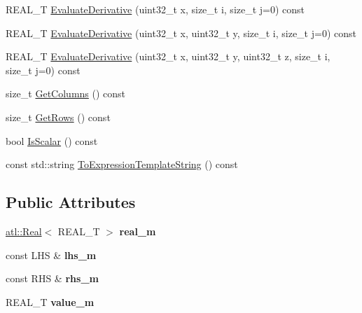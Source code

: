 \begin{DoxyCompactItemize}
\item 
R\+E\+A\+L\+\_\+\+T \hyperlink{structatl_1_1_pow_a9f3c0b19723d735fa733764006c84914}{Evaluate\+Derivative} (uint32\+\_\+t x, size\+\_\+t i, size\+\_\+t j=0) const 
\item 
R\+E\+A\+L\+\_\+\+T \hyperlink{structatl_1_1_pow_ac192ad0cdb7592038e0d4af6e735fe88}{Evaluate\+Derivative} (uint32\+\_\+t x, uint32\+\_\+t y, size\+\_\+t i, size\+\_\+t j=0) const 
\item 
R\+E\+A\+L\+\_\+\+T \hyperlink{structatl_1_1_pow_a337409b2b5e07d18b20458c59fa069f2}{Evaluate\+Derivative} (uint32\+\_\+t x, uint32\+\_\+t y, uint32\+\_\+t z, size\+\_\+t i, size\+\_\+t j=0) const 
\item 
size\+\_\+t \hyperlink{structatl_1_1_pow_a2ed5957f759a023657429d3a750f027a}{Get\+Columns} () const 
\item 
size\+\_\+t \hyperlink{structatl_1_1_pow_ab8184e894327ee2de4f6c6600a57344d}{Get\+Rows} () const 
\item 
bool \hyperlink{structatl_1_1_pow_a063b34eeb877161d1e24d358a179515c}{Is\+Scalar} () const 
\item 
const std\+::string \hyperlink{structatl_1_1_pow_acfc21ce83c00307ed77d575a263c15b5}{To\+Expression\+Template\+String} () const 
\end{DoxyCompactItemize}
\subsection*{Public Attributes}
\begin{DoxyCompactItemize}
\item 
\hypertarget{structatl_1_1_pow_ae8863f02dcc5b532addb5df805e89cfc}{\hyperlink{structatl_1_1_real}{atl\+::\+Real}$<$ R\+E\+A\+L\+\_\+\+T $>$ {\bfseries real\+\_\+m}}\label{structatl_1_1_pow_ae8863f02dcc5b532addb5df805e89cfc}

\item 
\hypertarget{structatl_1_1_pow_a303898c5af96f347781cf1b47a97f202}{const L\+H\+S \& {\bfseries lhs\+\_\+m}}\label{structatl_1_1_pow_a303898c5af96f347781cf1b47a97f202}

\item 
\hypertarget{structatl_1_1_pow_a74f0d6779873d6b336db9ad470370db2}{const R\+H\+S \& {\bfseries rhs\+\_\+m}}\label{structatl_1_1_pow_a74f0d6779873d6b336db9ad470370db2}

\item 
\hypertarget{structatl_1_1_pow_a3982a1d9d34c60425521448f2e06a0bb}{R\+E\+A\+L\+\_\+\+T {\bfseries value\+\_\+m}}\label{structatl_1_1_pow_a3982a1d9d34c60425521448f2e06a0bb}

\end{DoxyCompactItemize}


